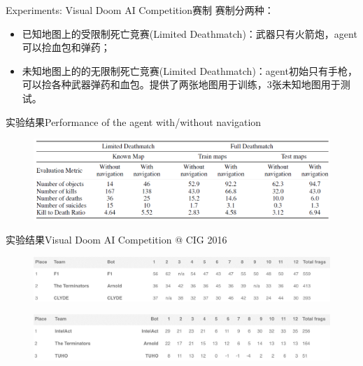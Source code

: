 \documentclass[10pt]{beamer}
\begin{document}
	\begin{frame}{Experiments: Visual Doom AI Competition}{赛制}
		赛制分两种：
		\begin{itemize}
			\item 已知地图上的受限制死亡竞赛(Limited Deathmatch)：武器只有火箭炮，agent可以捡血包和弹药；
			
			\item 未知地图上的的无限制死亡竞赛(Limited Deathmatch)：agent初始只有手枪，可以捡各种武器弹药和血包。提供了两张地图用于训练，3张未知地图用于测试。
		\end{itemize}
	\end{frame}

	\begin{frame}{实验结果}{Performance of the agent with/without navigation}
		\begin{figure}
			\centering
			\includegraphics[width=0.9\linewidth]{pictures/fps-exper-result-1}
		\end{figure}
	\end{frame}

	\begin{frame}{实验结果}{Visual Doom AI Competition @ CIG 2016}
		\begin{figure}
			\centering
			\includegraphics[width=0.9\linewidth]{pictures/fps-exper-result-2}
		\end{figure}
		\begin{figure}
			\centering
			\includegraphics[width=0.9\linewidth]{pictures/fps-exper-result-3}
		\end{figure}
	\end{frame}
\end{document}
